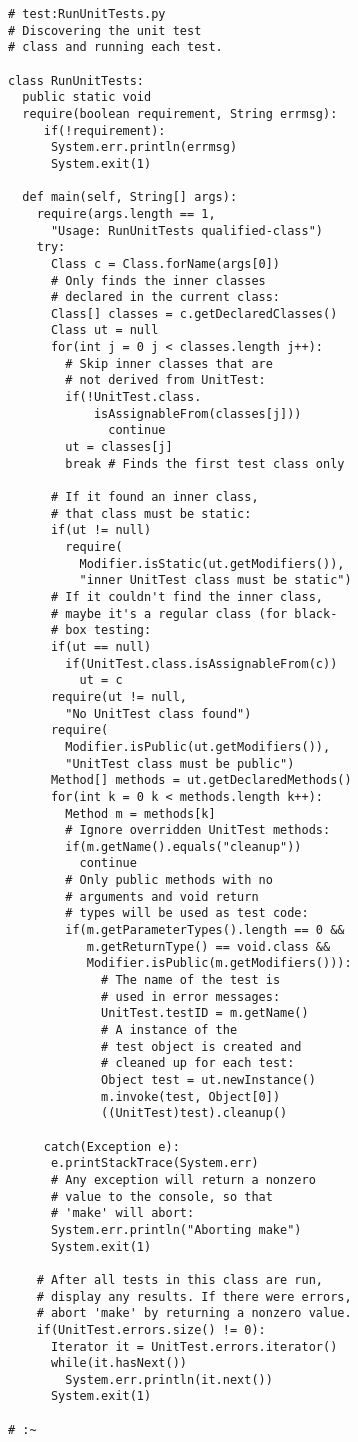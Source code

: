  \begin{lstlisting} 
# test:RunUnitTests.py 
# Discovering the unit test 
# class and running each test.

class RunUnitTests: 
  public static void  
  require(boolean requirement, String errmsg): 
     if(!requirement): 
      System.err.println(errmsg) 
      System.exit(1) 
      
  def main(self, String[] args): 
    require(args.length == 1, 
      "Usage: RunUnitTests qualified-class") 
    try: 
      Class c = Class.forName(args[0]) 
      # Only finds the inner classes  
      # declared in the current class: 
      Class[] classes = c.getDeclaredClasses() 
      Class ut = null 
      for(int j = 0 j < classes.length j++): 
        # Skip inner classes that are  
        # not derived from UnitTest: 
        if(!UnitTest.class. 
            isAssignableFrom(classes[j])) 
              continue 
        ut = classes[j] 
        break # Finds the first test class only 
        
      # If it found an inner class,  
      # that class must be static: 
      if(ut != null) 
        require( 
          Modifier.isStatic(ut.getModifiers()), 
          "inner UnitTest class must be static") 
      # If it couldn't find the inner class,  
      # maybe it's a regular class (for black- 
      # box testing: 
      if(ut == null) 
        if(UnitTest.class.isAssignableFrom(c)) 
          ut = c 
      require(ut != null,  
        "No UnitTest class found") 
      require( 
        Modifier.isPublic(ut.getModifiers()), 
        "UnitTest class must be public") 
      Method[] methods = ut.getDeclaredMethods() 
      for(int k = 0 k < methods.length k++): 
        Method m = methods[k] 
        # Ignore overridden UnitTest methods: 
        if(m.getName().equals("cleanup")) 
          continue 
        # Only public methods with no  
        # arguments and void return  
        # types will be used as test code: 
        if(m.getParameterTypes().length == 0 && 
           m.getReturnType() == void.class && 
           Modifier.isPublic(m.getModifiers())): 
             # The name of the test is  
             # used in error messages: 
             UnitTest.testID = m.getName() 
             # A instance of the  
             # test object is created and  
             # cleaned up for each test: 
             Object test = ut.newInstance() 
             m.invoke(test, Object[0]) 
             ((UnitTest)test).cleanup() 
             
     catch(Exception e): 
      e.printStackTrace(System.err) 
      # Any exception will return a nonzero  
      # value to the console, so that  
      # 'make' will abort: 
      System.err.println("Aborting make") 
      System.exit(1) 
  
    # After all tests in this class are run, 
    # display any results. If there were errors, 
    # abort 'make' by returning a nonzero value. 
    if(UnitTest.errors.size() != 0): 
      Iterator it = UnitTest.errors.iterator() 
      while(it.hasNext()) 
        System.err.println(it.next()) 
      System.exit(1) 
      
# :~ 
  
 \end{lstlisting}

